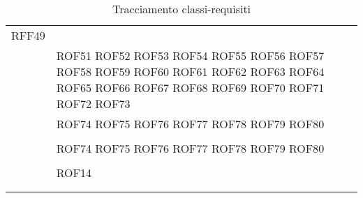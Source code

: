 \documentclass[../DefinizioneDiProdotto_v2.0.0.tex]{subfiles}
\begin{document}
\begin{longtable}{p{8.5cm}!{\VRule[1pt]}p{2.5cm}}
	RFF49                           \\
	                                                                    & ROF51 \newline
	ROF52 \newline
	ROF53 \newline
	ROF54 \newline
	ROF55 \newline
	ROF56 \newline
	ROF57 \newline
	ROF58 \newline
	ROF59 \newline
	ROF60 \newline
	ROF61 \newline
	ROF62 \newline
	ROF63 \newline
	ROF64 \newline
	ROF65 \newline
	ROF66 \newline
	ROF67 \newline
	ROF68 \newline
	ROF69 \newline
	ROF70 \newline
	ROF71 \newline
	ROF72 \newline
	ROF73 \\
	                                                                       & ROF74 \newline
	ROF75 \newline
	ROF76 \newline
	ROF77 \newline
	ROF78 \newline
	ROF79 \newline
	ROF80 \newline
	 \\
	                                                                                         &                                  \\
	& ROF74 \newline
	ROF75 \newline
	ROF76 \newline
	ROF77 \newline
	ROF78 \newline
	ROF79 \newline
	ROF80 \newline
	 \\                                                                                &                                  \\
	             & ROF14                            \\
	                   &                                  \\
	\caption{Tracciamento classi-requisiti}
\end{longtable}
\end{document}
